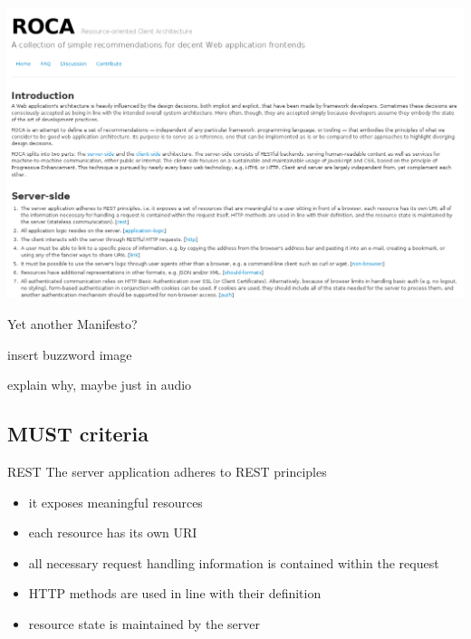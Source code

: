 \documentclass{beamer}
\begin{document}
\begin{frame}
  \Huge \insertsectionhead
\end{frame}

\begin{frame}
 \includegraphics[width=\textwidth]{images/roca-website-screenshot.png}
\end{frame}

\begin{frame}
  \Huge Yet another Manifesto?

  insert buzzword image
\end{frame}

\begin{frame}
  explain why, maybe just in audio
\end{frame}

\subsection{MUST criteria}

\begin{frame}{REST}
  The server application adheres to REST principles

  \begin{itemize}
    \item it exposes meaningful resources
    \item each resource has its own URI
    \item all necessary request handling information is contained within the request
    \item HTTP methods are used in line with their definition
    \item resource state is maintained by the server
  \end{itemize}
\end{frame}
\end{document}
